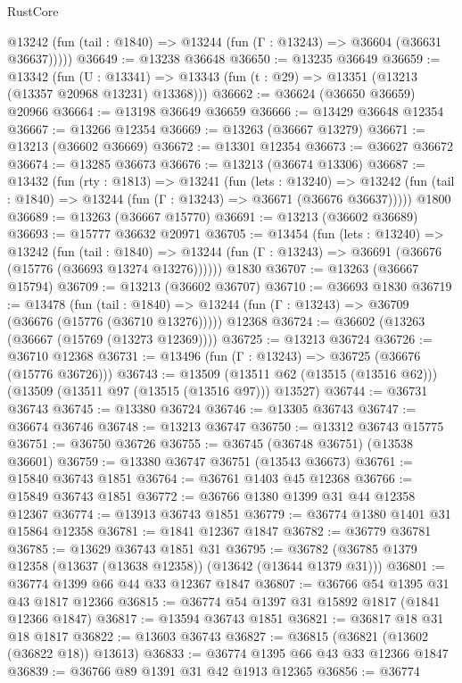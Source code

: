 \begin{lexlean}{RustCore}
\begin{coremodule}
      @13242 (fun (tail : @1840) => @13244 (fun (Γ : @13243) => @36604 (@36631 @36637)))))
@36649 := @13238 @36648
@36650 := @13235 @36649
@36659 := @13342
    (fun (U : @13341) => @13343 (fun (t : @29) => @13351 (@13213 (@13357 @20968 @13231) @13368)))
@36662 := @36624 (@36650 @36659) @20966
@36664 := @13198 @36649 @36659
@36666 := @13429 @36648 @12354
@36667 := @13266 @12354
@36669 := @13263 (@36667 @13279)
@36671 := @13213 (@36602 @36669)
@36672 := @13301 @12354
@36673 := @36627 @36672
@36674 := @13285 @36673
@36676 := @13213 (@36674 @13306)
@36687 := @13432
    (fun (rty : @1813) =>
    @13241
      (fun (lets : @13240) =>
      @13242 (fun (tail : @1840) => @13244 (fun (Γ : @13243) => @36671 (@36676 @36637)))))
    @1800
@36689 := @13263 (@36667 @15770)
@36691 := @13213 (@36602 @36689)
@36693 := @15777 @36632 @20971
@36705 := @13454
    (fun (lets : @13240) =>
    @13242
      (fun (tail : @1840) =>
      @13244 (fun (Γ : @13243) => @36691 (@36676 (@15776 (@36693 @13274 @13276))))))
    @1830
@36707 := @13263 (@36667 @15794)
@36709 := @13213 (@36602 @36707)
@36710 := @36693 @1830
@36719 := @13478
    (fun (tail : @1840) => @13244 (fun (Γ : @13243) => @36709 (@36676 (@15776 (@36710 @13276)))))
    @12368
@36724 := @36602 (@13263 (@36667 (@15769 (@13273 @12369))))
@36725 := @13213 @36724
@36726 := @36710 @12368
@36731 := @13496 (fun (Γ : @13243) => @36725 (@36676 (@15776 @36726)))
@36743 := @13509
    (@13511 @62 (@13515 (@13516 @62)))
    (@13509 (@13511 @97 (@13515 (@13516 @97))) @13527)
@36744 := @36731 @36743
@36745 := @13380 @36724
@36746 := @13305 @36743
@36747 := @36674 @36746
@36748 := @13213 @36747
@36750 := @13312 @36743 @15775
@36751 := @36750 @36726
@36755 := @36745 (@36748 @36751) (@13538 @36601)
@36759 := @13380 @36747 @36751 (@13543 @36673)
@36761 := @15840 @36743 @1851
@36764 := @36761 @1403 @45 @12368
@36766 := @15849 @36743 @1851
@36772 := @36766 @1380 @1399 @31 @44 @12358 @12367
@36774 := @13913 @36743 @1851
@36779 := @36774 @1380 @1401 @31 @15864 @12358
@36781 := @1841 @12367 @1847
@36782 := @36779 @36781
@36785 := @13629 @36743 @1851 @31
@36795 := @36782 (@36785 @1379 @12358 (@13637 (@13638 @12358)) (@13642 (@13644 @1379 @31)))
@36801 := @36774 @1399 @66 @44 @33 @12367 @1847
@36807 := @36766 @54 @1395 @31 @43 @1817 @12366
@36815 := @36774 @54 @1397 @31 @15892 @1817 (@1841 @12366 @1847)
@36817 := @13594 @36743 @1851
@36821 := @36817 @18 @31 @18 @1817
@36822 := @13603 @36743
@36827 := @36815 (@36821 (@13602 (@36822 @18)) @13613)
@36833 := @36774 @1395 @66 @43 @33 @12366 @1847
@36839 := @36766 @89 @1391 @31 @42 @1913 @12365
@36856 := @36774

\end{coremodule}
\end{lexlean}
